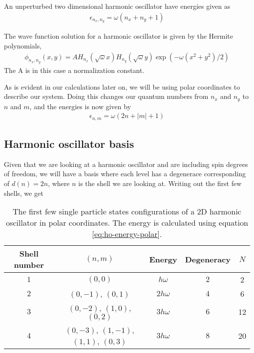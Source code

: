 \documentclass[11pt]{article}
\begin{document}
An unperturbed two dimensional harmonic oscillator have energies given as
\begin{align}
	\epsilon_{n_x,n_y} = \omega(n_x + n_y + 1)
	\label{eq:ho-energy-cartesian}
\end{align}

The wave function solution for a harmonic oscillator is given by the Hermite polynomials,
\begin{align}
	\phi_{n_x,n_y}(x,y) = AH_{n_x}(\sqrt{\omega}x)H_{n_y}(\sqrt{\omega}y)\exp(-\omega(x^2 + y^2)/2)
\end{align}
The A is in this case a normalization constant.

As is evident in our calculations later on, we will be using polar coordinates to describe our system. Doing this changes our quantum numbers from $n_x$ and $n_y$ to $n$ and $m$, and the energies is now given by
\begin{align}
	\epsilon_{n, m} = \omega(2n + |m| + 1)
	\label{eq:ho-energy-polar}
\end{align}

\subsection{Harmonic oscillator basis}
Given that we are looking at a harmonic oscillator and are including spin degrees of freedom, we will have a basis where each level has a degenerace corresponding of $d(n)=2n$, where $n$ is the shell we are looking at. Writing out the first few shells, we get

\begin{table}[H]
	\centering
	\begin{tabular}{c | c | c | c | c}
		Shell number & $(n,m)$ & Energy & Degeneracy & $N$ \\
		\hline
		$1$ & $(0,0)$ & $h\omega$ & $2$ & 2 \\
		$2$ & $(0,-1)$, $(0,1)$ & $2h\omega$ & $4$ & 6 \\
		$3$ & $(0,-2)$, $(1,0)$, $(0,2)$ & $3h\omega$ & $6$ & 12 \\
		$4$ & $(0,-3)$, $(1,-1)$, $(1,1)$, $(0,3)$ & $3h\omega$ & $8$ & 20 \\
	\end{tabular}
	\caption{The first few single particle states configurations of a 2D harmonic oscillator in polar coordinates. The energy is calculated using equation \eqref{eq:ho-energy-polar}.}
	\label{tab:shell-energies}
\end{table}
\end{document}

